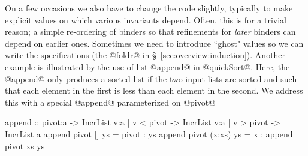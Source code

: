  On a few occasions we also have to change the
code slightly, typically to make explicit values on which various
invariants depend. Often, this is for a trivial reason; a simple
re-ordering of binders so that refinements for \emph{later} binders 
can depend on earlier ones. Sometimes we need to introduce
``ghost" values so we can write the specifications (\eg the @foldr@ in
\S~\ref{sec:overview:induction}). Another example is illustrated by the use
of list @append@ in @quickSort@. Here, the @append@ only produces a sorted
list if the two input lists are sorted and such that each element in
the first is less than each element in the second. 
We address this with a special @append@ parameterized on @pivot@ 
\begin{code}
  append :: pivot:a                    
         -> IncrList {v:a | v < pivot}  
         -> IncrList {v:a | v > pivot}  
         -> IncrList a              
  append pivot [] ys     = pivot : ys
  append pivot (x:xs) ys = x : append pivot xs ys
\end{code}


